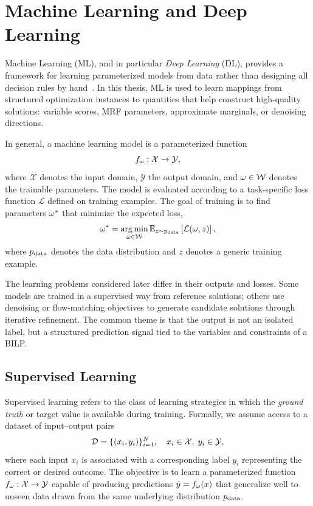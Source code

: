 \section{Machine Learning and Deep Learning}
\label{sec:ml_intro}

Machine Learning (ML), and in particular \emph{Deep Learning} (DL), provides a framework for learning parameterized models from data rather than designing all decision rules by hand~\cite{lecun_deep_2015,goodfellow_deep_2016}. In this thesis, ML is used to learn mappings from structured optimization instances to quantities that help construct high-quality solutions: variable scores, MRF parameters, approximate marginals, or denoising directions.

In general, a machine learning model is a parameterized function 
\begin{equation}
    f_{\omega} : \mathcal{X} \rightarrow \mathcal{Y},
\end{equation}
where $\mathcal{X}$ denotes the input domain, $\mathcal{Y}$ the output domain, and $\omega \in \mathcal{W}$ denotes the trainable parameters. The model is evaluated according to a task-specific loss function $\mathcal{L}$ defined on training examples. The goal of training is to find parameters $\omega^*$ that minimize the expected loss,
\begin{equation}
    \label{equ:training_task}
    \omega^*
    =
    \operatorname*{arg\,min}_{\omega \in \mathcal{W}}
    \mathbb{E}_{z \sim p_{\mathrm{data}}}
    \left[
        \mathcal{L}(\omega,z)
    \right],
\end{equation}
where $p_{\mathrm{data}}$ denotes the data distribution and $z$ denotes a generic training example.

The learning problems considered later differ in their outputs and losses. Some models are trained in a supervised way from reference solutions; others use denoising or flow-matching objectives to generate candidate solutions through iterative refinement. The common theme is that the output is not an isolated label, but a structured prediction signal tied to the variables and constraints of a BILP.


\subsection{Supervised Learning}
\label{sec:supervised_learning}

Supervised learning refers to the class of learning strategies in which the \emph{ground truth} or target value is available during training. Formally, we assume access to a dataset of input–output pairs 
\begin{equation}
    \mathcal{D} = \{(x_i, y_i)\}_{i=1}^{N}, \quad x_i \in \mathcal{X}, \; y_i \in \mathcal{Y},
\end{equation}
where each input $x_i$ is associated with a corresponding label $y_i$ representing the correct or desired outcome. The objective is to learn a parameterized function $f_{\omega} : \mathcal{X} \rightarrow \mathcal{Y}$ capable of producing predictions $\hat{y} = f_{\omega}(x)$ that generalize well to unseen data drawn from the same underlying distribution $p_{\mathrm{data}}$.

